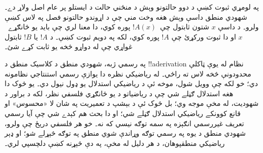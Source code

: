 \documentclass[../../../include/open-logic-chapter]{subfiles}
\begin{document}
په لومړي ثبوت کښې د دوو حالتونو وېش د منځني حالت د ايستلو
پر عام اصل ولاړ دے۔ شهودي منطق داسې وېش هغه وخت مني چې د
اړوندو حالتونو فصل په لاس کښې ولرو۔ د داسې $x$ شتون ثابتول چې~$!A(x)$ پوره
کوي، دا معنا لري چې بايد يو ځانګړے~$x$ او دا ثبوت ورکړئ چې $!A$ پوره
کوي، لکه په دويم ثبوت کښې۔ د $!A$ يا $!B$ ثابتول غواړي چې له دواړو
څخه يو ثابت کړے شئ۔

په رسمي ژبه، شهودي منطق د کلاسيک منطق د !!a{derivation} نظام له يوې
ټاکلې محدودونې څخه لاس ته راځي۔ له رياضيکي نظره دا يوازې رسمي استنتاجي
نظامونه دي؛ خو لکه چې وويل شول، موخه ئې د رياضيکي استدلال يو ډول نيول
دي۔ يو څوک دا هغه استدلال ګڼلے شي چې د رياضياتو د يو ځانګړي فلسفي
نظر، لکه د براور د شهوديت، له مخې موجه وي؛ بل څوک ئې د بېشپ د تعميريت
په شان لا «محسوس» او قانع کوونکے رياضيکي استدلال ګڼلے شي؛ او دا بحث
هم کېدے شي چې آيا رسمي تعريف غيررسمي انګېزه په سمه توګه نيسي که نه۔
خو هر فلسفي دريځ چې ولرو، شهودي منطق د يوه په رسمي توګه وړاندې شوي
منطق په توګه څېړلے شو؛ او ډېر رياضيکي منطقپوهان، د هر دليل له مخې،
په دې څېړنه کښې دلچسپي لري۔
\end{document}
